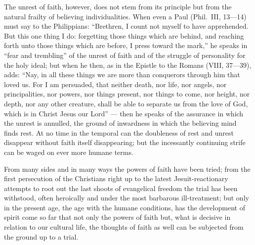 \documentclass[12pt]{book}
\newcommand{\opage}[1]{\marginnote{\footnotesize\textit{[#1]}}}
\begin{document}
The unrest of faith, however, does not stem from its principle but from the
natural frailty of believing individualities. When even a Paul (Phil.\ III,
13---14) must say to the Philippians: ``Brethren, I count not myself to have
apprehended. But this one thing I do: forgetting those things which are
behind, and reaching forth unto those things which are before, I press toward
the mark,'' he speaks in ``fear and trembling'' of the unrest of faith and of
the struggle of personality for the holy ideal; but when he then, as in the
Epistle to the Romans (VIII, 37---39), adds: ``Nay, in all these things we are
more than conquerors through him that loved us. For I am persuaded, that
neither death, nor life, nor angels, nor principalities, nor powers, nor
things present, nor
\opage{277}\setcounter{footnote}{0}%
things to come, nor height, nor depth, nor any other creature, shall be able
to separate us from the love of God, which is in Christ Jesus our Lord'' ---
then he speaks of the assurance in which the unrest is annulled, the ground of
inwardness in which the believing mind finds rest. At no time in the temporal
can the doubleness of rest and unrest disappear without faith itself
disappearing;
but the incessantly continuing strife can be waged on ever more humane terms.

From many sides and in many ways the powers of faith have been tried; from the
first persecution of the Christians right up to the latest Jesuit-reactionary
attempts to root out the last shoots of evangelical freedom the trial has been
withstood, often heroically and under the most barbarous ill-treatment; but
only in the present age, the age with the humane conditions, has the
development of spirit come so far that not only the powers of faith but, what
is decisive in relation to our cultural life, the thoughts of faith as well
can be subjected from the ground up to a trial.
\end{document}
